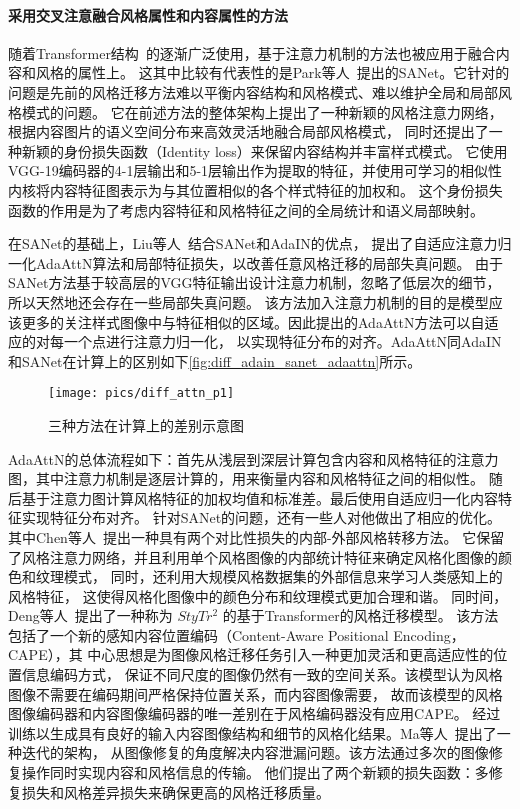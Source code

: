 \paragraph{采用交叉注意融合风格属性和内容属性的方法}
随着Transformer结构~\cite{vaswani2017attention}的逐渐广泛使用，基于注意力机制的方法也被应用于融合内容和风格的属性上。
这其中比较有代表性的是Park等人~\cite{park2019arbitrary}提出的SANet。它针对的问题是先前的风格迁移方法难以平衡内容结构和风格模式、难以维护全局和局部风格模式的问题。
它在前述方法的整体架构上提出了一种新颖的风格注意力网络，根据内容图片的语义空间分布来高效灵活地融合局部风格模式，
同时还提出了一种新颖的身份损失函数（Identity loss）来保留内容结构并丰富样式模式。
它使用VGG-19编码器的4-1层输出和5-1层输出作为提取的特征，并使用可学习的相似性内核将内容特征图表示为与其位置相似的各个样式特征的加权和。
这个身份损失函数的作用是为了考虑内容特征和风格特征之间的全局统计和语义局部映射。
\par 在SANet的基础上，Liu等人~\cite{liu2021adaattn}结合SANet和AdaIN的优点，
提出了自适应注意力归一化AdaAttN算法和局部特征损失，以改善任意风格迁移的局部失真问题。
由于SANet方法基于较高层的VGG特征输出设计注意力机制，忽略了低层次的细节，所以天然地还会存在一些局部失真问题。
该方法加入注意力机制的目的是模型应该更多的关注样式图像中与特征相似的区域。因此提出的AdaAttN方法可以自适应的对每一个点进行注意力归一化，
以实现特征分布的对齐。AdaAttN同AdaIN和SANet在计算上的区别如下\autoref{fig:diff_adain_sanet_adaattn}所示。
\begin{figure}[htbp]
    \centering
    \texttt{[image: pics/diff\_attn\_p1]}
    \caption{\label{fig:diff_adain_sanet_adaattn}三种方法在计算上的差别示意图}
\end{figure}

AdaAttN的总体流程如下：首先从浅层到深层计算包含内容和风格特征的注意力图，其中注意力机制是逐层计算的，用来衡量内容和风格特征之间的相似性。
随后基于注意力图计算风格特征的加权均值和标准差。最后使用自适应归一化内容特征实现特征分布对齐。
针对SANet的问题，还有一些人对他做出了相应的优化。其中Chen等人~\cite{chen2021artistic}提出一种具有两个对比性损失的内部-外部风格转移方法。
它保留了风格注意力网络，并且利用单个风格图像的内部统计特征来确定风格化图像的颜色和纹理模式，
同时，还利用大规模风格数据集的外部信息来学习人类感知上的风格特征，
这使得风格化图像中的颜色分布和纹理模式更加合理和谐。
同时间，Deng等人~\cite{deng2022stytr2}提出了一种称为 $StyTr^2$ 的基于Transformer的风格迁移模型。
该方法包括了一个新的感知内容位置编码（Content-Aware Positional Encoding，CAPE），其
中心思想是为图像风格迁移任务引入一种更加灵活和更高适应性的位置信息编码方式，
保证不同尺度的图像仍然有一致的空间关系。该模型认为风格图像不需要在编码期间严格保持位置关系，而内容图像需要，
故而该模型的风格图像编码器和内容图像编码器的唯一差别在于风格编码器没有应用CAPE。
经过训练以生成具有良好的输入内容图像结构和细节的风格化结果。Ma等人~\cite{ma2023rast}提出了一种迭代的架构，
从图像修复的角度解决内容泄漏问题。该方法通过多次的图像修复操作同时实现内容和风格信息的传输。
他们提出了两个新颖的损失函数：多修复损失和风格差异损失来确保更高的风格迁移质量。

